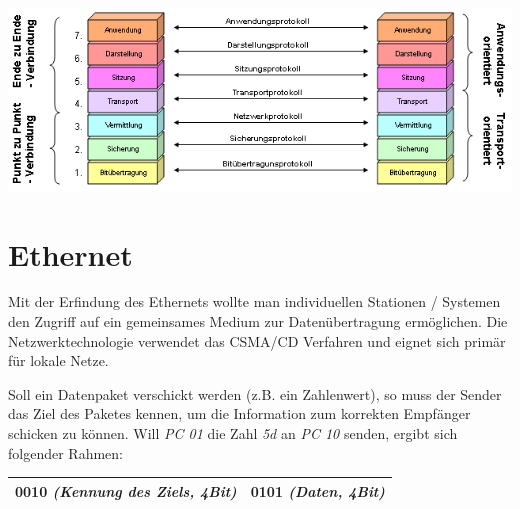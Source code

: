 \documentclass[12pt,a4paper]{article}
\begin{document}
    \includegraphics[scale=.75]{Bilder/OSI-Modell2}

\section{Ethernet}
    Mit der Erfindung des Ethernets wollte man individuellen Stationen / Systemen den Zugriff auf ein gemeinsames Medium zur Datenübertragung ermöglichen. Die Netzwerktechnologie verwendet das CSMA/CD Verfahren und eignet sich primär für lokale Netze.
	\begin{figure}[h]
        \centering
	\end{figure}\newline
    Soll ein Datenpaket verschickt werden (z.B. ein Zahlenwert), so muss der Sender das Ziel des Paketes kennen, um die Information zum korrekten Empfänger schicken zu können. \newline
    Will \textit{PC 01} die Zahl \textit{5d} an \textit{PC 10} senden, ergibt sich folgender Rahmen:
	\begin{center}
		\begin{tabularx}{14cm}{|X|X|}
			\hline
			0010 \textit{(Kennung des Ziels, 4Bit)}&0101 \textit{(Daten, 4Bit)}\\
			\hline
		\end{tabularx}
	\end{center}
\end{document}
